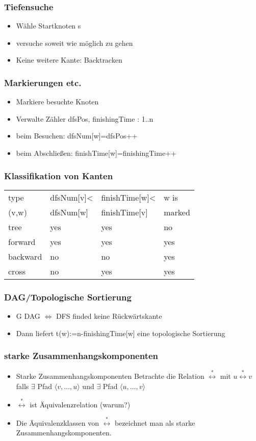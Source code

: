 \begin{frame}
\frametitle{Tiefensuche}
\begin{itemize}
\item Wähle Startknoten s\pause
\item versuche soweit wie möglich zu gehen\pause
\item Keine weitere Kante: Backtracken
\end{itemize}
\end{frame}

\begin{frame}
\frametitle{Markierungen etc.}
\begin{itemize}
\item Markiere besuchte Knoten\pause
\item Verwalte Zähler dfsPos, finishingTime : 1..n\pause
\item beim Besuchen: dfsNum[w]=dfsPos++
\item beim Abschließen: finishTime[w]=finishingTime++
\end{itemize}
\end{frame}

\begin{frame}
\frametitle{Klassifikation von Kanten}
\begin{tabular}{l||l|l|l}
type & dfsNum[v]< & finishTime[w]< & w is\\
(v,w) & dfsNum[w] & finishTime[v] & marked\\\hline
tree & yes & yes & no\\
forward & yes & yes & yes\\
backward & no & no & yes\\
cross & no & yes & yes\\
\end{tabular}
\end{frame}

\begin{frame}
\frametitle{DAG/Topologische Sortierung}
\begin{itemize}
\item G DAG $\Leftrightarrow$ DFS finded keine Rückwärtskante\pause
\item Dann liefert t(w):=n-finishingTime[w] eine topologische Sortierung
\end{itemize}
\end{frame}

\begin{frame}
\frametitle{starke Zusammenhangskomponenten}
\begin{itemize}
\item Starke Zusammenhangskomponenten
Betrachte die Relation $\stackrel{*}{\leftrightarrow}$ mit $u\stackrel{*}{\leftrightarrow}v$ falls $\exists$ Pfad $\langle v,\ldots,u\rangle$ und $\exists$ Pfad $\langle u,\ldots,v\rangle$
\item $\stackrel{*}{\leftrightarrow}$ ist Äquivalenzrelation (warum?)\pause
\item Die Äquivalenzklassen von $\stackrel{*}{\leftrightarrow}$ bezeichnet man als starke Zusammenhangskomponenten.
\end{itemize}
\end{frame}

